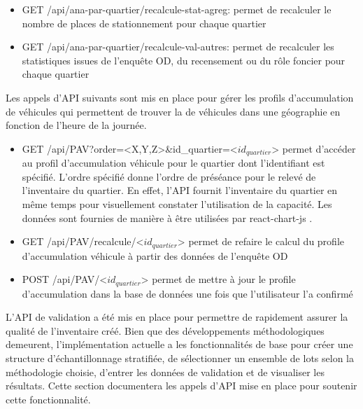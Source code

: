 \begin{itemize}
    \item GET /api/ana-par-quartier/recalcule-stat-agreg: permet de recalculer le nombre de places de stationnement pour chaque quartier
    \item GET /api/ana-par-quartier/recalcule-val-autres: permet de recalculer les statistiques issues de l'enquête OD, du recensement ou du rôle foncier pour chaque quartier
\end{itemize}
Les appels d'\ac{API} suivants sont mis en place pour gérer les profils d'accumulation de véhicules \parencite{diallo_methodology_2015,morency_characterizing_2008} qui permettent de trouver la \fg{} de véhicules dans une géographie en fonction de l'heure de la journée.
\begin{itemize}
    \item GET /api/PAV?order=<X,Y,Z>\&id\_quartier=<$id_{quartier}$> permet d'accéder au profil d'accumulation véhicule pour le quartier dont l'identifiant est spécifié. L'ordre spécifié donne l'ordre de préséance pour le relevé de l'inventaire du quartier. En effet, l'\ac{API} fournit l'inventaire du quartier en même temps pour visuellement constater l'utilisation de la capacité. Les données sont fournies de manière à être utilisées par react-chart-js \parencite{ayerst_react-chartjs-2_2017}.
    \item GET /api/PAV/recalcule/<$id_{quartier}$> permet de refaire le calcul du profile d'accumulation véhicule à partir des données de l'enquête OD
    \item POST /api/PAV/<$id_{quartier}$> permet de mettre à jour le profile d'accumulation dans la base de données une fois que l'utilisateur l'a confirmé
\end{itemize}
L'\ac{API} de validation a été mis en place pour permettre de rapidement assurer la qualité de l'inventaire créé. Bien que des développements méthodologiques demeurent, l'implémentation actuelle a les fonctionnalités de base pour créer une structure d'échantillonnage stratifiée, de sélectionner un ensemble de lots selon la méthodologie choisie, d'entrer les données de validation et de visualiser les résultats. Cette section documentera les appels d'\ac{API} mise en place pour soutenir cette fonctionnalité.  
